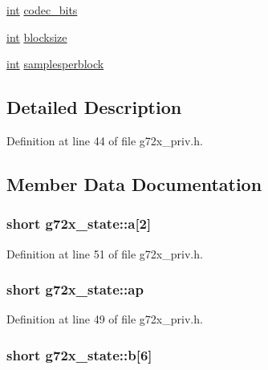 \begin{DoxyCompactItemize}
\item 
\hyperlink{xmltok_8h_a5a0d4a5641ce434f1d23533f2b2e6653}{int} \hyperlink{structg72x__state_ac1cf11976cf5e5de26f1b729b414e8ef}{codec\+\_\+bits}
\item 
\hyperlink{xmltok_8h_a5a0d4a5641ce434f1d23533f2b2e6653}{int} \hyperlink{structg72x__state_a12e0b1aa82fa4032c66def7b9434a0f5}{blocksize}
\item 
\hyperlink{xmltok_8h_a5a0d4a5641ce434f1d23533f2b2e6653}{int} \hyperlink{structg72x__state_ad950cfa7f0088ed244266198834d5fb0}{samplesperblock}
\end{DoxyCompactItemize}


\subsection{Detailed Description}


Definition at line 44 of file g72x\+\_\+priv.\+h.



\subsection{Member Data Documentation}
\subsubsection[{\texorpdfstring{a}{a}}]{\setlength{\rightskip}{0pt plus 5cm}short g72x\+\_\+state\+::a\mbox{[}2\mbox{]}}\hypertarget{structg72x__state_a0cb2efc8e71a7ebda36711f1bde39b7a}{}\label{structg72x__state_a0cb2efc8e71a7ebda36711f1bde39b7a}


Definition at line 51 of file g72x\+\_\+priv.\+h.

\subsubsection[{\texorpdfstring{ap}{ap}}]{\setlength{\rightskip}{0pt plus 5cm}short g72x\+\_\+state\+::ap}\hypertarget{structg72x__state_ad26205671030ec76f87bf86248241b3f}{}\label{structg72x__state_ad26205671030ec76f87bf86248241b3f}


Definition at line 49 of file g72x\+\_\+priv.\+h.

\subsubsection[{\texorpdfstring{b}{b}}]{\setlength{\rightskip}{0pt plus 5cm}short g72x\+\_\+state\+::b\mbox{[}6\mbox{]}}\hypertarget{structg72x__state_a79a0dbc644fa660bc668b6c36ba1cdc1}{}\label{structg72x__state_a79a0dbc644fa660bc668b6c36ba1cdc1}


